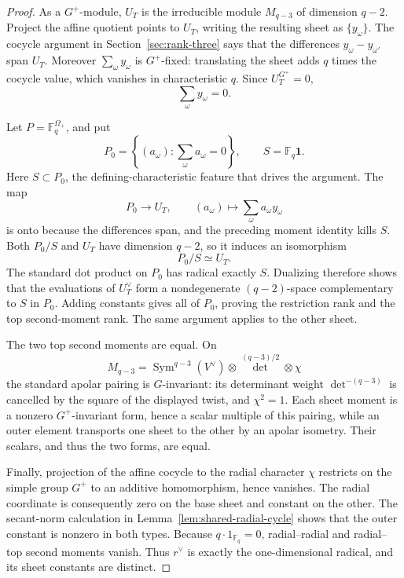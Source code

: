 \documentclass[11pt]{article}
\theoremstyle{definition}
\theoremstyle{remark}
\newcommand{\F}{\mathbb{F}}
\begin{document}
\begin{proof}
As a \(G^+\)-module, \(U_T\) is the irreducible module
\(M_{q-3}\) of dimension \(q-2\).  Project the affine quotient points to
\(U_T\), writing the resulting sheet as \(\{y_\omega\}\).
The cocycle argument in Section~\ref{sec:rank-three} says that the
differences \(y_\omega-y_{\omega'}\) span \(U_T\).
Moreover \(\sum_\omega y_\omega\) is \(G^+\)-fixed: translating the
sheet adds \(q\) times the cocycle value, which vanishes in
characteristic \(q\).  Since \(U_T^{G^+}=0\),
\[
 \sum_\omega y_\omega=0.
\]

Let \(P=\F_q^{\Omega_+}\), and put
\[
 P_0=\left\{(a_\omega):\sum_\omega a_\omega=0\right\},
 \qquad S=\F_q\mathbf1.
\]
Here \(S\subset P_0\), the defining-characteristic feature that drives
the argument.  The map
\[
 P_0\longrightarrow U_T,\qquad
 (a_\omega)\longmapsto\sum_\omega a_\omega y_\omega
\]
is onto because the differences span, and the preceding moment identity
kills \(S\).  Both \(P_0/S\) and \(U_T\) have dimension \(q-2\), so it
induces an isomorphism
\[
 P_0/S\simeq U_T.
\]
The standard dot product on \(P_0\) has radical exactly \(S\).
Dualizing therefore shows that the evaluations of \(U_T^\vee\) form a
nondegenerate \((q-2)\)-space complementary to \(S\) in \(P_0\).
Adding constants gives all of \(P_0\), proving the restriction rank and
the top second-moment rank.  The same argument applies to the other
sheet.

The two top second moments are equal.  On
\[
 M_{q-3}=\operatorname{Sym}^{q-3}(V^\vee)
          \otimes\det^{(q-3)/2}\otimes\chi
\]
the standard apolar pairing is \(G\)-invariant: its determinant weight
\(\det^{-(q-3)}\) is cancelled by the square of the displayed twist,
and \(\chi^2=1\).  Each sheet moment is a nonzero
\(G^+\)-invariant form, hence a scalar multiple of this pairing, while
an outer element transports one sheet to the other by an apolar
isometry.  Their scalars, and thus the two forms, are equal.

Finally, projection of the affine cocycle to the radial character
\(\chi\) restricts on the simple group \(G^+\) to an additive
homomorphism, hence vanishes.  The radial coordinate is consequently
zero on the base sheet and constant on the other.  The secant-norm
calculation in Lemma~\ref{lem:shared-radial-cycle} shows that the outer
constant is nonzero in both types.  Because
\(q\cdot1_{\F_q}=0\), radial--radial and radial--top second moments vanish.  Thus
\(r^\vee\) is exactly the one-dimensional radical, and its sheet
constants are distinct.
\end{proof}
\end{document}
